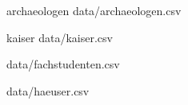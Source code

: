 \usepackage{datatool}
\DTLloaddb%
{archaeologen}%
{data/archaeologen.csv}%

\DTLloaddb%
{kaiser}%
{data/kaiser.csv}%


\usepackage[section=subsection,%
nonumberlist,%
nopostdot,%
]{glossaries}%
\makeglossaries

\usepackage{SIunits}

{data/fachstudenten.csv}

{data/haeuser.csv}

\usepackage{databar}%
\usepackage{datapie}%

\usepackage{etoolbox}%
\newtoggle{hund}%
\newtoggle{nocopyright}

\newcommand\missingcopyright{
\iftoggle{nocopyright}
{\setkeys{Gin}{draft}%
\setkeys{draftfigure}{%
filename = true,
content = {Abbildung musste aufgrund fehlender Digitalrechte ausgeblendet werden.}}}
{}}